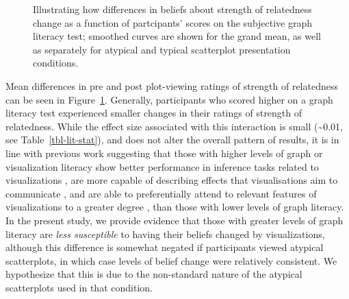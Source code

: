 \documentclass[manuscript,screen,review]{acmart}
\begin{document}
\begin{figure}


\caption{\label{fig-lit-smooth}Illustrating how differences in beliefs
about strength of relatedness change as a function of partcipants'
scores on the subjective graph literacy test; smoothed curves are shown
for the grand mean, as well as separately for atypical and typical
scatterplot presentation conditions.}

\end{figure}%

Mean differences in pre and post plot-viewing ratings of strength of
relatedness can be seen in Figure~\ref{fig-lit-smooth}. Generally,
participants who scored higher on a graph literacy test experienced
smaller changes in their ratings of strength of relatedness. While the
effect size associated with this interaction is small
(\textasciitilde0.01, see Table~\ref{tbl-lit-stat}), and does not alter
the overall pattern of results, it is in line with previous work
suggesting that those with higher levels of graph or visualization
literacy show better performance in inference tasks related to
visualizations \citep{canham_2010}, are more capable of describing
effects that visualisations aim to communicate \citep{shah_2011}, and
are able to preferentially attend to relevant features of visualizations
to a greater degree \citep{okan_2015}, than those with lower levels of
graph literacy. In the present study, we provide evidence that those
with greater levels of graph literacy are \emph{less susceptible} to
having their beliefs changed by visualizations, although this difference
is somewhat negated if participants viewed atypical scatterplots, in
which case levels of belief change were relatively consistent. We
hypothesize that this is due to the non-standard nature of the atypical
scatterplots used in that condition.
\end{document}
